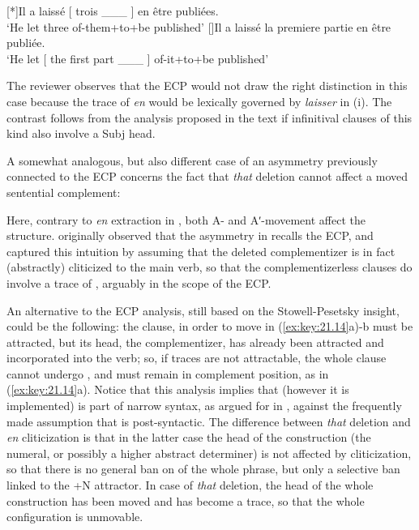 \documentclass[output=paper]{langsci/langscibook}
\begin{document}
\begin{exe}
{\begin{exe}
    [*]{Il a laissé [ trois \_\_\_ ]  en être publiées.\\
        ‘He let three of-them+to+be published’}
    []{Il a laissé la premiere partie en être publiée.\\
        ‘He let [ the first part \_\_\_ ] of-it+to+be published’}
\end{exe}
%
The reviewer observes that the \gls{ECP} would not draw the right distinction
in this case because the trace of \emph{en} would be lexically governed by
\emph{laisser} in (i). The contrast follows from the analysis proposed in the
text if infinitival clauses of this kind also involve a  Subj\tss{[+N]} head.}

A somewhat analogous, but also different case of an asymmetry previously
connected to the \gls{ECP} concerns the fact that \emph{that} deletion cannot
affect a moved sentential complement:

\ea%
    \label{ex:key:21.14}
    \z
\z
%
Here, contrary to \emph{en} extraction in , both A- and Aʹ-movement
affect the structure. \citet{Stowell1981} originally observed that the
asymmetry in  recalls the \gls{ECP}, and \citet{Pesetsky1995}
captured this intuition by assuming that the deleted complementizer is in fact
(abstractly) cliticized to the main verb, so that the complementizerless
clauses do involve a trace of , arguably in the scope of the ECP.

An alternative to the \gls{ECP} analysis, still based on the Stowell-Pesetsky
insight, could be the following: the clause, in order to move in
(\ref{ex:key:21.14}a)-b must be attracted, but its head, the complementizer, has
already been attracted and incorporated into the verb; so, if traces are not
attractable, the whole clause cannot undergo , and must remain in
complement position, as in  (\ref{ex:key:21.14}a). Notice that this analysis
implies that  (however it is implemented) is part of narrow
syntax, as argued for in \citet{Roberts2010}, against the frequently made
assumption that  is post-syntactic. The difference between
\emph{that} deletion and \emph{en} cliticization is that in the latter case the
head of the construction (the numeral, or possibly a higher abstract
determiner) is not affected by cliticization, so that there is no general ban
on  of the whole phrase, but only a selective ban linked to the +N
attractor. In case of \emph{that} deletion, the head of the whole construction
has been moved and has become a trace, so that the whole configuration is
unmovable.


\end{exe}
\end{document}
